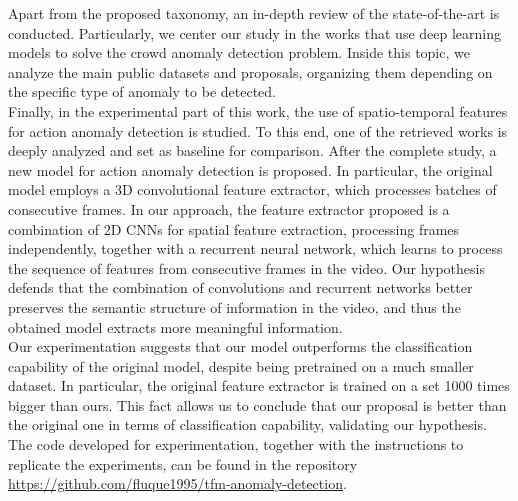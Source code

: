 \documentclass[../main.tex]{memoir}
\begin{document}
Apart from the proposed taxonomy, an in-depth review of the
state-of-the-art is conducted. Particularly, we center our study in
the works that use deep learning models to solve the crowd anomaly
detection problem. Inside this topic, we analyze the main public
datasets and proposals, organizing them depending on the specific type
of anomaly to be detected.\\

Finally, in the experimental part of this work, the use of
spatio-temporal features for action anomaly detection is studied. To
this end, one of the retrieved works is deeply analyzed and set as
baseline for comparison. After the complete study, a new model for
action anomaly detection is proposed. In particular, the original
model employs a 3D convolutional feature extractor, which processes
batches of consecutive frames. In our approach, the feature extractor
proposed is a combination of 2D CNNs for spatial feature extraction,
processing frames independently, together with a recurrent neural
network, which learns to process the sequence of features from
consecutive frames in the video. Our hypothesis defends that the
combination of convolutions and recurrent networks better preserves
the semantic structure of information in the video, and thus the
obtained model extracts more meaningful information.\\

Our experimentation suggests that our model outperforms the
classification capability of the original model, despite being
pretrained on a much smaller dataset. In particular, the original
feature extractor is trained on a set 1000 times bigger than ours.
This fact allows us to conclude that our proposal is better than
the original one in terms of classification capability, validating
our hypothesis.\\

The code developed for experimentation, together with the instructions
to replicate the experiments, can be found in the repository
\url{https://github.com/fluque1995/tfm-anomaly-detection}.

\newpage
\end{document}
